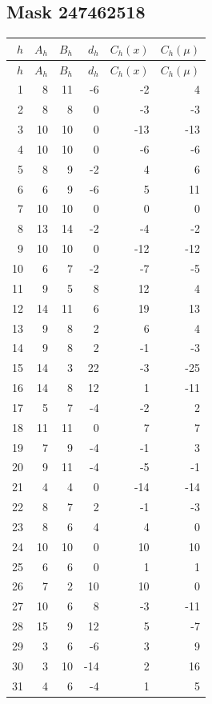 \documentclass[11pt]{article}
\begin{document}
\subsection{Mask 247462518}
\begin{center}\scriptsize
\begin{longtable}{r r r r r r}
\toprule $h$ & $A_h$ & $B_h$ & $d_h$ & $C_h(x)$ & $C_h(\mu)$\\
\midrule\endfirsthead
\toprule $h$ & $A_h$ & $B_h$ & $d_h$ & $C_h(x)$ & $C_h(\mu)$\\
\midrule\endhead
1 & 8 & 11 & -6 & -2 & 4\\
2 & 8 & 8 & 0 & -3 & -3\\
3 & 10 & 10 & 0 & -13 & -13\\
4 & 10 & 10 & 0 & -6 & -6\\
5 & 8 & 9 & -2 & 4 & 6\\
6 & 6 & 9 & -6 & 5 & 11\\
7 & 10 & 10 & 0 & 0 & 0\\
8 & 13 & 14 & -2 & -4 & -2\\
9 & 10 & 10 & 0 & -12 & -12\\
10 & 6 & 7 & -2 & -7 & -5\\
11 & 9 & 5 & 8 & 12 & 4\\
12 & 14 & 11 & 6 & 19 & 13\\
13 & 9 & 8 & 2 & 6 & 4\\
14 & 9 & 8 & 2 & -1 & -3\\
15 & 14 & 3 & 22 & -3 & -25\\
16 & 14 & 8 & 12 & 1 & -11\\
17 & 5 & 7 & -4 & -2 & 2\\
18 & 11 & 11 & 0 & 7 & 7\\
19 & 7 & 9 & -4 & -1 & 3\\
20 & 9 & 11 & -4 & -5 & -1\\
21 & 4 & 4 & 0 & -14 & -14\\
22 & 8 & 7 & 2 & -1 & -3\\
23 & 8 & 6 & 4 & 4 & 0\\
24 & 10 & 10 & 0 & 10 & 10\\
25 & 6 & 6 & 0 & 1 & 1\\
26 & 7 & 2 & 10 & 10 & 0\\
27 & 10 & 6 & 8 & -3 & -11\\
28 & 15 & 9 & 12 & 5 & -7\\
29 & 3 & 6 & -6 & 3 & 9\\
30 & 3 & 10 & -14 & 2 & 16\\
31 & 4 & 6 & -4 & 1 & 5\\

\end{longtable}
\end{center}
\end{document}
